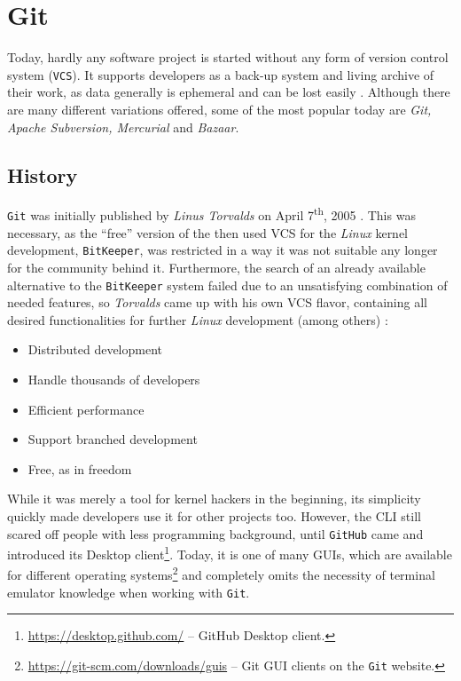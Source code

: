 \section{Git}
\label{sec:git}

Today, hardly any software project is started without any form of version control system (\texttt{VCS}). It supports developers as a back-up system and living archive of their work, as data generally is ephemeral and can be lost easily \cite[1]{loeliger2012version}. Although there are many different variations offered, some of the most popular today are \emph{Git, Apache Subversion, Mercurial} and \emph{Bazaar}.

\subsection{History}
\label{sec:git-history}
\texttt{Git} was initially published by \emph{Linus Torvalds} on April 7\textsuperscript{th}, 2005 \cite[6]{loeliger2012version}. This was necessary, as the ``free'' version of the then used VCS for the \emph{Linux} kernel development, \texttt{BitKeeper}, was restricted in a way it was not suitable any longer for the community behind it. Furthermore, the search of an already available alternative to the \texttt{BitKeeper} system failed due to an unsatisfying combination of needed features, so \emph{Torvalds} came up with his own VCS flavor, containing all desired functionalities for further \emph{Linux} development (among others) \cite[4]{loeliger2012version}:

\begin{itemize}
  \item Distributed development
  \item Handle thousands of developers
  \item Efficient performance
  \item Support branched development
  \item Free, as in freedom
\end{itemize}

While it was merely a tool for kernel hackers in the beginning, its simplicity quickly made developers use it for other projects too. However, the CLI still scared off people with less programming background, until \texttt{GitHub} came and introduced its Desktop client\footnote{\url{https://desktop.github.com/} -- GitHub Desktop client.}. Today, it is one of many GUIs, which are available for different operating systems\footnote{\url{https://git-scm.com/downloads/guis} -- Git GUI clients on the \texttt{Git} website.} and completely omits the necessity of terminal emulator knowledge when working with \texttt{Git}.

